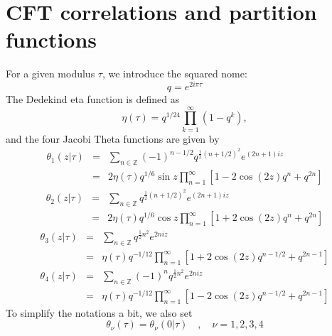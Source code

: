 \documentclass[11pt]{iopart}
\begin{document}
\section[\;\;\;\;\;\;\;\;\;\;\;\;\;\;CFT correlations and partition functions]{CFT correlations and partition functions}
\label{sec:CFT_Jacobi}
For a given modulus $\tau$, we introduce the squared nome:
\begin{equation}
 q=e^{2i\pi \tau}
\end{equation}
The Dedekind eta function is defined as 
\begin{equation}\label{eq:eta_def}
 \eta(\tau)=q^{1/ 24}\prod_{k=1}^{\infty}\left(1-q^k\right),
\end{equation}
and the four Jacobi Theta functions are given by
\begin{eqnarray}\label{eq:theta1_def}
 \theta_1(z|\tau)&=&\sum_{n \in \mathbb{Z}}(-1)^{n-1/2}q^{\frac{1}{2}(n+1/2)^2}e^{(2n+1)iz}\\
 &=&2\eta(\tau)q^{1/6} \sin z\prod_{n=1}^{\infty} \left[1-2 \cos(2z) q^{n}+q^{2n}\right]
\end{eqnarray}
\begin{eqnarray}\label{eq:theta2_def}
 \theta_2(z|\tau)&=&\sum_{n \in \mathbb{Z}}q^{\frac{1}{2}(n+1/2)^2}e^{(2n+1)iz}\\
 &=&2\eta(\tau)q^{1/6} \cos z\prod_{n=1}^{\infty} \left[1+2 \cos(2z) q^{n}+q^{2n}\right]
\end{eqnarray}
\begin{eqnarray}\label{eq:theta3_def}
 \theta_3(z|\tau)&=&\sum_{n \in \mathbb{Z}}q^{\frac{1}{2}n^2}e^{2niz}\\
 &=&\eta(\tau)q^{-1/12}\prod_{n=1}^{\infty} \left[1+2 \cos(2z) q^{n-1/2}+q^{2n-1}\right]
\end{eqnarray}
\begin{eqnarray}\label{eq:theta4_def}
 \theta_4(z|\tau)&=&\sum_{n \in \mathbb{Z}}(-1)^{n}q^{\frac{1}{2}n^2}e^{2niz}\\
 &=&\eta(\tau)q^{-1/12}\prod_{n=1}^{\infty} \left[1-2 \cos(2z) q^{n-1/2}+q^{2n-1}\right]
\end{eqnarray}
To simplify the notations a bit, we also set
\begin{equation}\label{eq:thetas}
 \theta_\nu(\tau)=\theta_\nu (0|\tau)\quad,\quad \nu=1,2,3,4
\end{equation}
\end{document}
